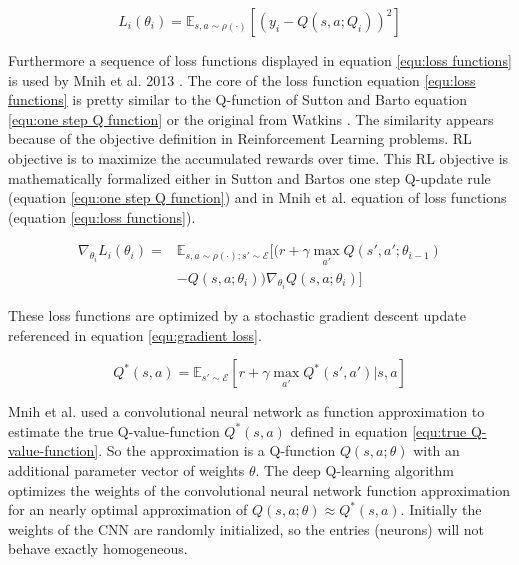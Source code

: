 \documentclass[conference]{IEEEtran}
\begin{document}
\begin{equation} \label{equ:loss functions}
L_i(\theta_i) = \mathbb{E}_{s,a \sim \rho(\cdot)} [(y_i - Q(s,a;Q_i))^2]
\end{equation}

Furthermore a sequence of loss functions displayed in equation \ref{equ:loss functions} is used by Mnih et al. 2013 \cite{mnih-atari-2013}. The core of the loss function equation \ref{equ:loss functions} is pretty similar to the Q-function of Sutton and Barto \cite{sutton_barto_98} equation \ref{equ:one step Q function} or the original from Watkins \cite{Watkins_1992}. The similarity appears because of the objective definition in Reinforcement Learning problems. RL objective is to maximize the accumulated rewards over time. This RL objective is mathematically formalized either in Sutton and Bartos one step Q-update rule (equation \ref{equ:one step Q function}) and in Mnih et al. equation of loss functions (equation \ref{equ:loss functions}).

\begin{equation} \label{equ:gradient loss}
\begin{split}
\nabla_{\theta_i} L_i (\theta_i) = & \mathbb{E}_{s,a \sim \rho(\cdot);s'\sim \mathcal{E}} [(r + \gamma \max_{a'} Q(s',a';\theta_{i-1}) \\
 & - Q(s,a;\theta_i)) \nabla_{\theta_i} Q(s,a;\theta_i)]
\end{split}
\end{equation}

These loss functions are optimized by a stochastic gradient descent update referenced in equation \ref{equ:gradient loss}. 

\begin{equation} \label{equ:true Q-value-function}
Q^*(s,a) = \mathbb{E}_{s' \sim \mathcal{E}} [r + \gamma \max_{a'} Q^* (s',a') |s,a]
\end{equation}

Mnih et al. used a convolutional neural network as function approximation to estimate the true Q-value-function $Q^*(s,a)$ defined in equation \ref{equ:true Q-value-function}. So the approximation is a Q-function $Q(s,a;\theta)$ with an additional parameter vector of weights $\theta$. The deep Q-learning algorithm optimizes the weights of the convolutional neural network function approximation for an nearly optimal approximation of $Q(s,a;\theta) \approx Q^*(s,a)$. Initially the weights of the CNN are randomly initialized, so the entries (neurons) will not behave exactly homogeneous.
\end{document}
